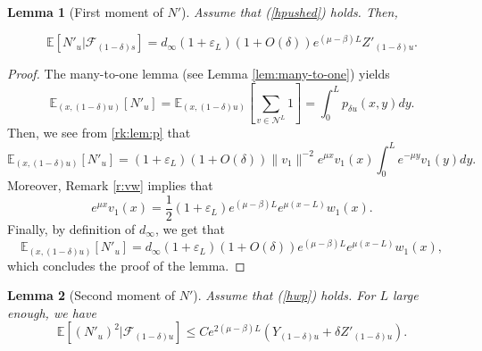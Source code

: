 \documentclass[11pt]{article}
\theoremstyle{plain}
\newtheorem{lemma}{Lemma}[section]
\newcommand\vep{\varepsilon}
\begin{document}
 \begin{lemma}[First moment of $N'$]\label{lem1:N} Assume that (\ref{hpushed}) holds. Then, 

\begin{equation*}
\mathbb{E}[N'_{u}|\mathcal{F}_{(1-\delta)s}]=d_\infty(1+\vep_L)(1+O(\delta))e^{(\mu-\beta)L}Z'_{(1-\delta)u}.
\end{equation*}
\end{lemma}
\begin{proof}
The many-to-one lemma (see Lemma \ref{lem:many-to-one}) yields
\begin{equation*}
\mathbb{E}_{(x,(1-\delta)u)}[N'_{u}]=\mathbb{E}_{(x,(1-\delta)u)}\left[\sum_{v\in\mathcal{N}^L}1\right]=\int_0^L p_{\delta u}(x,y)dy.
\end{equation*}
Then, we see from  \eqref{rk:lem:p} that
\begin{equation*}
\mathbb{E}_{(x,(1-\delta)u)}[N'_{u}]= (1+\vep_L)(1+O(\delta))\|v_1\|^{-2}e^{\mu x}v_1(x)\int_0^L e^{-\mu y}v_1(y)dy.
\end{equation*}
Moreover, Remark \ref{r:vw} implies that 
\begin{equation}
e^{\mu x}v_1(x)=\frac{1}{2}(1+\vep_L) e^{(\mu-\beta)L} e^{\mu(x-L)}w_1(x)\label{rem:21}.
\end{equation}
Finally, by definition of $d_\infty$, we get that
\begin{equation*}
\mathbb{E}_{(x,(1-\delta)u)}[N'_{u}]=d_\infty(1+\vep_L)(1+O(\delta))e^{(\mu-\beta)L}e^{\mu(x-L)}w_1(x),
\end{equation*}
 which concludes the proof of the lemma. 
\end{proof}



 \begin{lemma}[Second moment of $N'$]\label{lem2:N} Assume that (\ref{hwp}) holds. For $L$ large enough, we have
\begin{equation*}
\mathbb{E}\left[(N'_{u})^2|\mathcal{F}_{(1-\delta)u}\right]\leqslant C e^{2(\mu-\beta)L}\left(Y_{(1-\delta)u}+\delta Z'_{(1-\delta)u}\right).
\end{equation*}
 \end{lemma}
 
\end{document}
